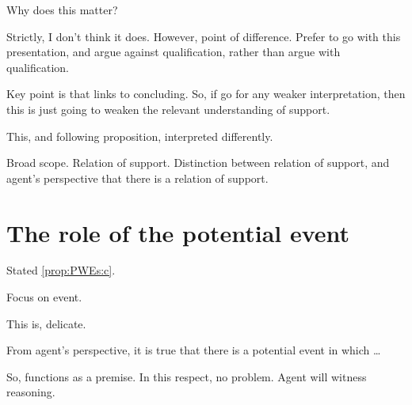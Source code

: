 \begin{note}
  Why does this matter?

  Strictly, I don't think it does.
  However, point of difference.
  Prefer to go with this presentation, and argue against qualification, rather than argue with qualification.

  Key point is that \qzS{} links to concluding.
  So, if go for any weaker interpretation, then this is just going to weaken the relevant understanding of support.

  This, and following proposition, interpreted differently.
  

  Broad scope.
  Relation of support.
  Distinction between relation of support, and agent's perspective that there is a relation of support.
\end{note}

\section{The role of the potential event}
\label{sec:no-premise}

\begin{note}
  Stated \ref{prop:PWEs:c}.

  Focus on event.

  This is, delicate.

  From agent's perspective, it is true that there is a potential event in which \dots

  So, functions as a premise.
  In this respect, no problem.
  Agent will witness reasoning.
\end{note}

